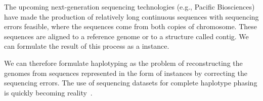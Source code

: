 The upcoming next-generation sequencing technologies (e.g., Pacific Biosciences) have made the production of relatively long continuous sequences with sequencing errors feasible, where the sequences come from both copies of chromosome.
These sequences are aligned to a reference genome or to a structure called contig. 
We can formulate the result of this process as a \GMEC instance.

We can therefore formulate haplotyping as the problem of reconstructing the genomes from sequences represented in the form of \GMEC instances by correcting the sequencing errors.
The use of sequencing datasets for complete haplotype phasing is quickly becoming reality~\cite{chin2016phased, chaisson2015resolving}.



